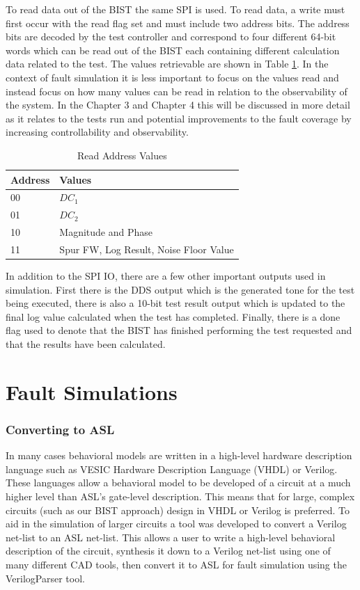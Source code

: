 \documentclass[12pt]{report}
\begin{document}
To read data out of the BIST the same SPI is used.  To read data, a write must first occur with the read flag set and must include two address bits.  The address bits are decoded by the test controller and correspond to four different 64-bit words which can be read out of the BIST each containing different calculation data related to the test.  The values retrievable are shown in Table \ref{tbl:readvals}.  In the context of fault simulation it is less important to focus on the values read and instead focus on how many values can be read in relation to the observability of the system.  In the Chapter 3 and Chapter 4 this will be discussed in more detail as it relates to the tests run and potential improvements to the fault coverage by increasing controllability and observability.  
\begin{table}
	\caption{Read Address Values}
	\begin{center}
		\begin{tabular}{|l|l|}
			\hline
			Address & Values \\ \hline
			00 & $DC_1$ \\ \hline
			01 & $DC_2$ \\ \hline
			10 & Magnitude and Phase \\ \hline
			11 & Spur FW, Log Result, Noise Floor Value \\ \hline			
		\end{tabular}
	\end{center}
	\label{tbl:readvals}
\end{table}

In addition to the SPI IO, there are a few other important outputs used in simulation.  First there is the DDS output which is the generated tone for the test being executed, there is also a 10-bit test result output which is updated to the final log value calculated when the test has completed.  Finally, there is a done flag used to denote that the BIST has finished performing the test requested and that the results have been calculated.  


\chapter{Fault Simulations}

\subsection{Converting to ASL}
In many cases behavioral models are written in a high-level hardware description language such as VESIC Hardware Description Language (VHDL) or Verilog.  These languages allow a behavioral model to be developed of a circuit at a much higher level than ASL's gate-level description.  This means that for large, complex circuits (such as our BIST approach) design in VHDL or Verilog is preferred.  To aid in the simulation of larger circuits a tool was developed to convert a Verilog net-list to an ASL net-list.  This allows a user to write a high-level behavioral description of the circuit, synthesis it down to a Verilog net-list using one of many different CAD tools, then convert it to ASL for fault simulation using the VerilogParser tool.
\end{document}
